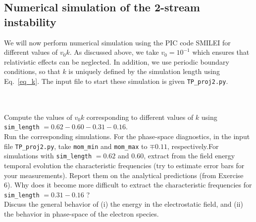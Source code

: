 \documentclass[10pt]{article}
\begin{document}
\subsection{Numerical simulation of the 2-stream instability}

We will now perform numerical simulation using the PIC code SMILEI for different values of $v_0 k$.
As discussed above, we take $v_0=10^{-1}$ which ensures that relativistic effects can be neglected.
In addition, we use periodic boundary conditions, so that $k$ is uniquely defined by the simulation length using Eq.~\eqref{eq_k}.
The input file to start these simulation is given \texttt{TP\_proj2.py}.

$ $\\
\\
 Compute the values of $v_0 k$ corresponding to different values of $k$ using \texttt{sim\_length} $= 0.62 - 0.60- 0.31 - 0.16$.\\
 Run the corresponding simulations.  For the phase-space diagnostics, in the input file \texttt{TP\_proj2.py}, take \texttt{mom\_min} and \texttt{mom\_max} to $\mp 0.11$, respectively.For simulations with \texttt{sim\_length} $= 0.62$ and $0.60$, extract from the field energy temporal evolution the characteristic frequencies (try to estimate error bars for your measurements). Report them on the analytical predictions (from Exercise 6). Why does it become more difficult to extract the characteristic frequencies for \texttt{sim\_length} $= 0.31 - 0.16$ ?\\
 Discuss the general behavior of (i) the energy in the electrostatic field, and (ii) the behavior in phase-space of the electron species. \\
\end{document}
